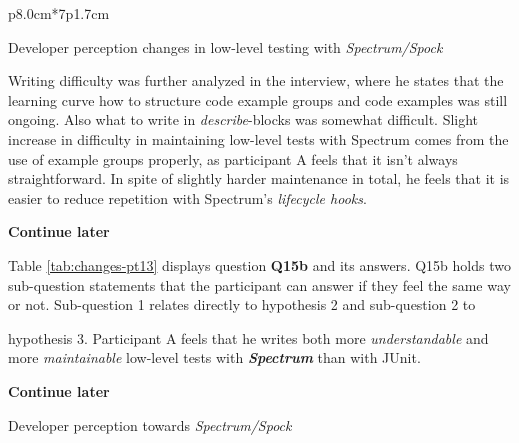 \begin{table}[H]
{\begin{tttabular}{p{8.0cm}*{7}{p{1.7cm}}}
            \end{tttabular}}
            \caption {Developer perception changes in low-level testing with \textit{Spectrum/Spock}} \label{tab:changes-pt12}
    \end{table}

Writing difficulty was further analyzed in
the interview, where he states that the learning curve how to structure code example groups and code examples was still ongoing.
Also what to write in \textit{describe}-blocks was somewhat difficult. Slight increase in difficulty in maintaining low-level
tests with Spectrum comes from the use of example groups properly, as participant A feels that it
isn't always straightforward. In spite of slightly harder maintenance in total, he feels that it is easier to reduce repetition
with Spectrum's \textit{lifecycle hooks}.

\textbf{Continue later}

Table \ref{tab:changes-pt13} displays question \textbf{Q15b} and its answers. Q15b holds two sub-question statements that the participant can answer
if they feel the same way or not. Sub-question 1 relates directly to hypothesis 2 and sub-question 2 to

hypothesis 3. Participant A feels that he writes both more \textit{understandable} and more \textit{maintainable} low-level
tests with \textbf{\textit{Spectrum}} than with JUnit.

\textbf{Continue later}

    \begin{table}[H]
            \caption {Developer perception towards \textit{Spectrum/Spock}} \label{tab:changes-pt13}

    \end{table}


